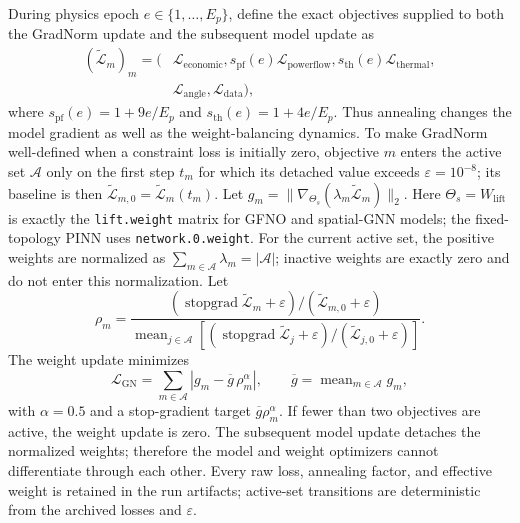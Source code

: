 \documentclass[final,5p,times,twocolumn]{elsarticle}
\newcommand{\mean}{\operatorname{mean}}
\begin{document}
During physics epoch $e\in\{1,\ldots,E_p\}$, define the exact objectives
supplied to both the GradNorm update and the subsequent model update as
\begin{equation}
  \begin{aligned}
  (\widetilde{\mathcal L}_m)_m
  =\big(&
    \mathcal L_{\mathrm{economic}},
    s_{\mathrm{pf}}(e)\mathcal L_{\mathrm{powerflow}},
    s_{\mathrm{th}}(e)\mathcal L_{\mathrm{thermal}},\\[-2pt]
    &\mathcal L_{\mathrm{angle}},
    \mathcal L_{\mathrm{data}}
  \big),
  \end{aligned}
  \label{eq:annealed_objectives}
\end{equation}
where $s_{\mathrm{pf}}(e)=1+9e/E_p$ and
$s_{\mathrm{th}}(e)=1+4e/E_p$. Thus annealing changes the model gradient as
well as the weight-balancing dynamics. To make GradNorm
\cite{chen2018gradnorm} well-defined when a constraint loss is initially zero,
objective $m$ enters the active set $\mathcal A$ only on the first step
$t_m$ for which its detached value exceeds $\varepsilon=10^{-8}$; its baseline
is then $\widetilde{\mathcal L}_{m,0}
=\widetilde{\mathcal L}_m(t_m)$. Let
$g_m=\|\nabla_{\Theta_s}
  (\lambda_m\widetilde{\mathcal L}_m)\|_2$. Here
$\Theta_s=W_{\mathrm{lift}}$ is exactly the \texttt{lift.weight} matrix for
GFNO and spatial-GNN models; the fixed-topology PINN uses
\texttt{network.0.weight}. For the current active set, the positive weights
are normalized as $\sum_{m\in\mathcal A}\lambda_m=|\mathcal A|$; inactive
weights are exactly zero and do not enter this normalization. Let
\begin{equation}
 \rho_m=
 \frac{
  (\operatorname{stopgrad}\widetilde{\mathcal L}_m+\varepsilon)/
  (\widetilde{\mathcal L}_{m,0}+\varepsilon)}
 {\mean_{j\in\mathcal A}
  [(\operatorname{stopgrad}\widetilde{\mathcal L}_j+\varepsilon)/
  (\widetilde{\mathcal L}_{j,0}+\varepsilon)]}.
 \label{eq:relative_training_rate}
\end{equation}
The weight update minimizes
\begin{equation}
  \mathcal{L}_{\mathrm{GN}}
  =
  \sum_{m\in\mathcal A}
  \left|
    g_m-\overline g\,\rho_m^\alpha
  \right|,
  \qquad
  \overline g=\mean_{m\in\mathcal A} g_m,
  \label{eq:gradnorm}
\end{equation}
with $\alpha=0.5$ and a stop-gradient target
$\overline g\rho_m^\alpha$. If fewer than two objectives are active, the weight
update is zero. The subsequent model update detaches the normalized weights;
therefore the model and weight optimizers cannot differentiate through each
other. Every raw loss, annealing factor, and effective weight is retained in
the run artifacts; active-set transitions are deterministic from the archived
losses and $\varepsilon$.
\end{document}
